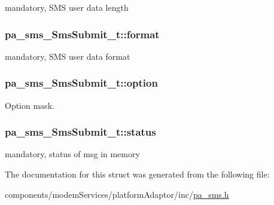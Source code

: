 mandatory, S\+MS user data length 

\subsubsection[{\texorpdfstring{format}{format}}]{ pa\+\_\+sms\+\_\+\+Sms\+Submit\+\_\+t\+::format}\hypertarget{structpa__sms___sms_submit__t_a3f2e97911a367cebb6bb91dabd596f2c}{}\label{structpa__sms___sms_submit__t_a3f2e97911a367cebb6bb91dabd596f2c}


mandatory, S\+MS user data format 

\subsubsection[{\texorpdfstring{option}{option}}]{ pa\+\_\+sms\+\_\+\+Sms\+Submit\+\_\+t\+::option}\hypertarget{structpa__sms___sms_submit__t_aaf227da3d71e6583bd21a4eeb3899bf1}{}\label{structpa__sms___sms_submit__t_aaf227da3d71e6583bd21a4eeb3899bf1}


Option mask. 

\subsubsection[{\texorpdfstring{status}{status}}]{ pa\+\_\+sms\+\_\+\+Sms\+Submit\+\_\+t\+::status}\hypertarget{structpa__sms___sms_submit__t_aa642c8f0f829e50df4112cec04ce7a9b}{}\label{structpa__sms___sms_submit__t_aa642c8f0f829e50df4112cec04ce7a9b}


mandatory, status of msg in memory 



The documentation for this struct was generated from the following file\+:\begin{DoxyCompactItemize}
\item 
components/modem\+Services/platform\+Adaptor/inc/\hyperlink{pa__sms_8h}{pa\+\_\+sms.\+h}\end{DoxyCompactItemize}
